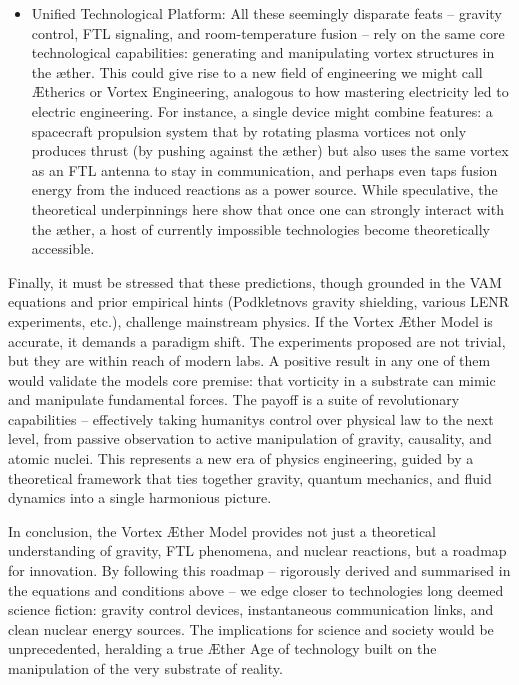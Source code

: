 \begin{itemize}
\item 
Unified Technological Platform: All these seemingly disparate feats – gravity control, FTL signaling, and room-temperature fusion – rely on the same core technological capabilities: generating and manipulating vortex structures in the æther. This could give rise to a new field of engineering we might call Ætherics or Vortex Engineering, analogous to how mastering electricity led to electric engineering. For instance, a single device might combine features: a spacecraft propulsion system that by rotating plasma vortices not only produces thrust (by pushing against the æther) but also uses the same vortex as an FTL antenna to stay in communication, and perhaps even taps fusion energy from the induced reactions as a power source. While speculative, the theoretical underpinnings here show that once one can strongly interact with the æther, a host of currently impossible technologies become theoretically accessible.




\end{itemize}

Finally, it must be stressed that these predictions, though grounded in the VAM equations and prior empirical hints (Podkletnov\rqs s gravity shielding, various LENR experiments, etc.), challenge mainstream physics. If the Vortex Æther Model is accurate, it demands a paradigm shift. The experiments proposed are not trivial, but they are within reach of modern labs. A positive result in any one of them would validate the model\rqs s core premise: that vorticity in a substrate can mimic and manipulate fundamental forces. The payoff is a suite of revolutionary capabilities – effectively taking humanity\rqs s control over physical law to the next level, from passive observation to active manipulation of gravity, causality, and atomic nuclei. This represents a new era of physics engineering, guided by a theoretical framework that ties together gravity, quantum mechanics, and fluid dynamics into a single harmonious picture.


In conclusion, the Vortex Æther Model provides not just a theoretical understanding of gravity, FTL phenomena, and nuclear reactions, but a roadmap for innovation. By following this roadmap – rigorously derived and summarised in the equations and conditions above – we edge closer to technologies long deemed science fiction: gravity control devices, instantaneous communication links, and clean nuclear energy sources. The implications for science and society would be unprecedented, heralding a true Æther Age of technology built on the manipulation of the very substrate of reality.


